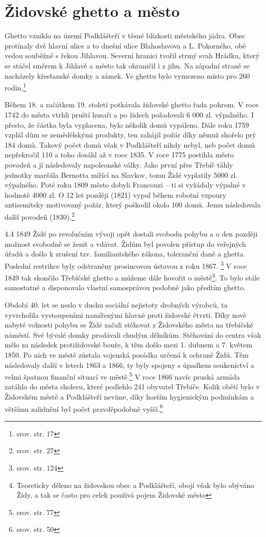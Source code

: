 \documentclass[a4paper,oneside,12pt]{report}
\begin{document}
\section{Židovské ghetto a město}

Ghetto vzniklo na území Podklášteří v těsné blízkosti městského jádra.
Obec protínaly dvě hlavní ulice a to dnešní ulice Blahoslavova a L. Pokorného, obě vedou souběžně s řekou Jihlavou.
Severní hranici tvořil strmý svah Hrádku, který se stáčel směrem k Jihlavě a město tak ohraničil i z jihu.
Na západní straně se nacházely křesťanské domky a zámek.
Ve ghettu bylo vymezeno místo pro 260 rodin.\footnote{srov. \cite{Kracmova2011} str. 17}

Během 18. a začátkem 19. století potkávala židovské ghetto řada pohrom.
V roce 1742 do města vtrhli pruští husaři a po židech požadovali 6 000 zl. výpalného.
I přesto, že částka byla vyplacena, bylo několik domů vypáleno.
Dále roku 1759 vzplál dům se zemědělskými produkty, ten zahájil požár díky němuž shořelo prý 184 domů.
Takový počet domů však v Podklášteří nikdy nebyl, neb počet domů nepřekročil 110 a toho dosáhl až v roce 1835.
V roce 1775 postihla město povodeň a jí následovaly napoleonské války.
Jako první přes Třebíč táhly jednotky maršála Bernotta mířící na Slavkov, tomu Židé vyplatily 5000 zl. výpalného.
Poté roku 1809 město dobyli Francouzi -- ti si vyžádaly výpalné v hodnotě 4000 zl.
O 12 let později (1821) vypul během robotní vzpoury antisemitsky motivovaný požár, který poškodil okolo 100 domů.
Jemu následovala další povodeň (1830).\footnote{srov. \cite{Fiser2005} str. 27}


4.4 1849 Židé po revolučním vývoji opět dostali svobodu pohybu a o den později možnost svobodně se ženit a vdávat.
Židům byl povolen přístup do veřejných úřadů a došlo k zrušení tzv. familiantského zákona, toleranční daně a ghetta.
Poslední restrikce byly odstraněny prosincovou ústavou z roku 1867. \footnote{srov. \cite{Pekny2001} str. 124}
V roce 1849 tak skončilo Třebíčské ghetto a můžeme dále hovořit o městě\footnote{Teoreticky děleno na židovskou obec a Podklášteří, obojí však bylo obýváno Židy, a tak se často pro celek používá pojem Židovské město}.
To bylo stále samostatné a disponovalo vlastní samosprávou podobně jako předtím ghetto.

Období 40. let se neslo v duchu sociální nejistoty drobných výrobců, ta vyvrcholila vystoupeními namířenými hlavně proti židovské čtvrti.
Díky nově nabyté volnosti pohybu se Židé začali stěhovat z Židovského města na třebíčské náměstí.
Své bývalé domky prodávali chudým dělníkům.
Stěhování do centra však mělo za následek protižidovské bouře, k těm došlo mezi 1. dubnem a 7. květem 1850.
Po nich ve městě zůstala vojenská posádka určená k ochraně Židů.
Těm následovaly další v letech 1863 a 1866, ty byly spojeny s úpadkem soukenictví a velmi špatnou finanční situací ve městě.\footnote{srov. \cite{Janak1981} str. 77}
V roce 1866 navíc pruská armáda zatáhla do města choleru, které podlehlo 241 obyvatel Třebíče.
Kolik obětí bylo v Židovském městě a Podklášteří nevíme, díky horším hygienickým podmínkám a většímu zalidnění byl počet pravděpodobně vyšší.\footnote{srov.  str. 50}
\end{document}
